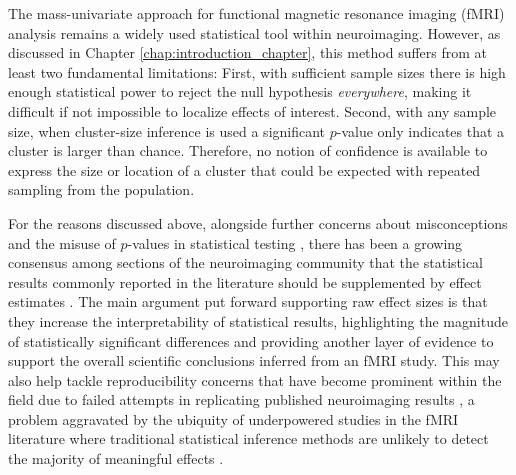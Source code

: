 The mass-univariate approach for functional magnetic resonance imaging (fMRI) analysis remains a widely used  statistical tool within neuroimaging. However, as discussed in Chapter \ref{chap:introduction_chapter}, this method suffers from at least two fundamental limitations: First, with sufficient sample sizes there is high enough statistical power to reject the null hypothesis \textit{everywhere}, making it difficult if not impossible to localize effects of interest. Second, with any sample size, when cluster-size inference is used a significant $p$-value only indicates that a cluster is larger than chance. Therefore, no notion of confidence is available to express the size or location of a cluster that could be expected with repeated sampling from the population.

For the reasons discussed above, alongside further concerns about misconceptions and the misuse of $p$-values in statistical testing \citep{Nuzzo2014-wi,Wasserstein2016-hv}, there has been a growing consensus among sections of the neuroimaging community that the statistical results commonly reported in the literature should be supplemented by effect estimates \citep{Chen2017-sb,Nichols2017-zo}. The main argument put forward supporting raw effect sizes is that they increase the interpretability of statistical results, highlighting the magnitude of statistically significant differences and providing another layer of evidence to support the overall scientific conclusions inferred from an fMRI study. This may also help tackle reproducibility concerns that have become prominent within the field due to failed attempts in replicating published neuroimaging results \citep{Poldrack2017-rr}, a problem aggravated by the ubiquity of underpowered studies in the fMRI literature where traditional statistical inference methods are unlikely to detect the majority of meaningful effects \citep{Cremers2017-qk,Turner2018-xs}.  

